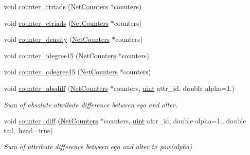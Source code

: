 \begin{Indent}
\begin{DoxyCompactItemize}
\item 
void \hyperlink{namespacebarry_1_1counters_1_1network_a5b6fdd52d0fca0ca994f6ba619123265}{counter\+\_\+ttriads} (\hyperlink{namespacebarry_1_1counters_1_1network_aa72fdb34752ac24167a06ee196a8fff6}{Net\+Counters} $\ast$counters)
\item 
void \hyperlink{namespacebarry_1_1counters_1_1network_af04b15d38a744b0e741005c44b581368}{counter\+\_\+ctriads} (\hyperlink{namespacebarry_1_1counters_1_1network_aa72fdb34752ac24167a06ee196a8fff6}{Net\+Counters} $\ast$counters)
\item 
void \hyperlink{namespacebarry_1_1counters_1_1network_a91e3daed40ea0514e0ede00ab303a738}{counter\+\_\+density} (\hyperlink{namespacebarry_1_1counters_1_1network_aa72fdb34752ac24167a06ee196a8fff6}{Net\+Counters} $\ast$counters)
\item 
void \hyperlink{namespacebarry_1_1counters_1_1network_a27ece7e2bbf1ca87810c5ffbdfcce9fc}{counter\+\_\+idegree15} (\hyperlink{namespacebarry_1_1counters_1_1network_aa72fdb34752ac24167a06ee196a8fff6}{Net\+Counters} $\ast$counters)
\item 
void \hyperlink{namespacebarry_1_1counters_1_1network_af4ab196a242dd233010b342712fe0449}{counter\+\_\+odegree15} (\hyperlink{namespacebarry_1_1counters_1_1network_aa72fdb34752ac24167a06ee196a8fff6}{Net\+Counters} $\ast$counters)
\item 
void \hyperlink{namespacebarry_1_1counters_1_1network_a0150bbe24de4218a40c0880e55c73e9e}{counter\+\_\+absdiff} (\hyperlink{namespacebarry_1_1counters_1_1network_aa72fdb34752ac24167a06ee196a8fff6}{Net\+Counters} $\ast$counters, \hyperlink{namespacebarry_a11dfc53ddb4672278319aa04f1e09a6c}{uint} attr\+\_\+id, double alpha=1.)
\begin{DoxyCompactList}\small\item\em Sum of absolute attribute difference between ego and alter. \end{DoxyCompactList}\item 
void \hyperlink{namespacebarry_1_1counters_1_1network_a2050eea4ac26f5e10483622633081962}{counter\+\_\+diff} (\hyperlink{namespacebarry_1_1counters_1_1network_aa72fdb34752ac24167a06ee196a8fff6}{Net\+Counters} $\ast$counters, \hyperlink{namespacebarry_a11dfc53ddb4672278319aa04f1e09a6c}{uint} attr\+\_\+id, double alpha=1., double tail\+\_\+head=true)
\begin{DoxyCompactList}\small\item\em Sum of attribute difference between ego and alter to pow(alpha) \end{DoxyCompactList}\item 

\end{DoxyCompactItemize}
\end{Indent}
